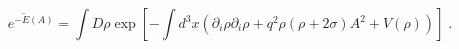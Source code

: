 \begin{equation}
e^{-\widetilde{E}(A)}=\int D\rho \exp \left[ -\int d^{3}x\left( \partial
_{i}\rho \partial _{i}\rho +q^{2}\rho (\rho +2\sigma )A^{2}+V(\rho )\right)
\right] \;.  \label{pr}
\end{equation}

